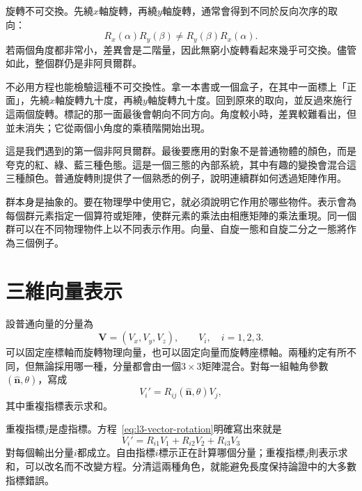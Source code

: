 旋轉不可交換。先繞\(x\)軸旋轉，再繞\(y\)軸旋轉，通常會得到不同於反向次序的取向：
\begin{equation}
R_x(\alpha)R_y(\beta)\ne R_y(\beta)R_x(\alpha).
\end{equation}
若兩個角度都非常小，差異會是二階量，因此無窮小旋轉看起來幾乎可交換。儘管如此，整個群仍是非阿貝爾群。

不必用方程也能檢驗這種不可交換性。拿一本書或一個盒子，在其中一面標上「正面」，先繞\(x\)軸旋轉九十度，再繞\(y\)軸旋轉九十度。回到原來的取向，並反過來施行這兩個旋轉。標記的那一面最後會朝向不同方向。角度較小時，差異較難看出，但並未消失；它從兩個小角度的乘積階開始出現。

\begin{classroomqa}
\end{classroomqa}

這是我們遇到的第一個非阿貝爾群。最後要應用的對象不是普通物體的顏色，而是夸克的紅、綠、藍三種色態。這是一個三態的內部系統，其中有趣的變換會混合這三種顏色。普通旋轉則提供了一個熟悉的例子，說明連續群如何透過矩陣作用。

群本身是抽象的。要在物理學中使用它，就必須說明它作用於哪些物件。{表示}會為每個群元素指定一個算符或矩陣，使群元素的乘法由相應矩陣的乘法重現。同一個群可以在不同物理物件上以不同表示作用。向量、自旋一態和自旋二分之一態將作為三個例子。

\section{三維向量表示}

設普通向量的分量為
\begin{equation}
\boldsymbol V=(V_x,V_y,V_z),\qquad V_i,\quad i=1,2,3.
\end{equation}
可以固定座標軸而旋轉物理向量，也可以固定向量而旋轉座標軸。兩種約定有所不同，但無論採用哪一種，分量都會由一個\(3\times3\)矩陣混合。對每一組軸角參數\((\hat{\boldsymbol n},\theta)\)，寫成
\begin{equation}
V_i'=R_{ij}(\hat{\boldsymbol n},\theta)V_j,
\label{eq:l3-vector-rotation}
\end{equation}
其中重複指標表示求和。

重複指標\(j\)是虛指標。方程~\eqref{eq:l3-vector-rotation}明確寫出來就是
\begin{equation}
V_i'=R_{i1}V_1+R_{i2}V_2+R_{i3}V_3
\end{equation}
對每個輸出分量\(i\)都成立。自由指標\(i\)標示正在計算哪個分量；重複指標\(j\)則表示求和，可以改名而不改變方程。分清這兩種角色，就能避免長度保持論證中的大多數指標錯誤。

